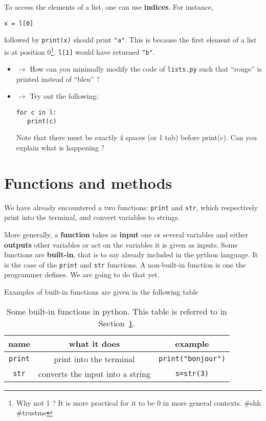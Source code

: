 \documentclass{article}
\begin{document}
To access the elements of a list, one can use \textbf{indices}. For instance,
\begin{center}
    {\tt x = l[0]}
\end{center}
followed by {\tt print(x)} should print {\tt "a"}. This is because the first
element of a list is at position 0\footnote{Why not 1 ? It is more practical
for it to be 0 in more general contexts. \#shh \#trustme}. {\tt l[1]} would have
returned {\tt "b"}.

\begin{mdframed}[backgroundcolor=black!20!white]
\begin{itemize}
    \item $\rightarrow$ How can you minimally modify the code of {\tt lists.py}
        such that ``rouge'' is printed instead of ``bleu'' ?
    \item $\rightarrow$ Try out the following:
        \begin{center}
            {\tt for c in l:}\\
            {\tt \,\,\,print(c)}
        \end{center}
        Note that there must be exactly 4 spaces (or 1 tab) before print(c). Can you explain what is happening ?
\end{itemize}
\end{mdframed}

\section{Functions and methods}
\label{functions}

We have already encountered a two functions: {\tt print} and {\tt str},
which respectively print into the terminal, and convert variables to strings.

More generally, a \textbf{function} takes as \textbf{input} one or
several variables and either \textbf{outputs} other variables or
act on the variables it is given as inputs. Some functions are
\textbf{built-in}, that is to say already included in the python language.
It is the case of the {\tt print} and {\tt str} functions. A non-built-in
function is one the programmer defines. We are going to do that yet.

Examples of built-in functions are given in the following table
\begin{table}
\centering
    \begin{tabular}{|c|c|c|}
    \hline
    name & what it does & example \\
    \hline
        {\tt print} & print into the terminal & {\tt print("bonjour")}\\
    \hline
        {\tt str} & converts the input into a string & {\tt s=str(3)}\\
    \hline
        
    \end{tabular}
    \caption{Some built-in functions in python. This table is referred to in Section~\ref{functions}.}
\end{table}
\end{document}
